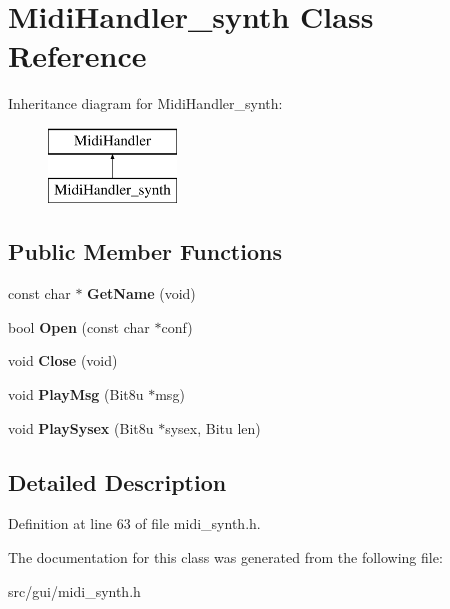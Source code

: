 \hypertarget{classMidiHandler__synth}{\section{Midi\-Handler\-\_\-synth Class Reference}
\label{classMidiHandler__synth}
}
Inheritance diagram for Midi\-Handler\-\_\-synth\-:\begin{figure}[H]
\begin{center}
\leavevmode
\includegraphics[height=2.000000cm]{classMidiHandler__synth}
\end{center}
\end{figure}
\subsection*{Public Member Functions}
\begin{DoxyCompactItemize}
\item 
\hypertarget{classMidiHandler__synth_a454a33652eaf4a99349caf378de56de0}{const char $\ast$ {\bfseries Get\-Name} (void)}\label{classMidiHandler__synth_a454a33652eaf4a99349caf378de56de0}

\item 
\hypertarget{classMidiHandler__synth_a026ce32cbfcb35586e6e6319a375f9ae}{bool {\bfseries Open} (const char $\ast$conf)}\label{classMidiHandler__synth_a026ce32cbfcb35586e6e6319a375f9ae}

\item 
\hypertarget{classMidiHandler__synth_ab73be86b44941f696b08a8eb2a4528e8}{void {\bfseries Close} (void)}\label{classMidiHandler__synth_ab73be86b44941f696b08a8eb2a4528e8}

\item 
\hypertarget{classMidiHandler__synth_afd4de648ae2becfbda22248e30856634}{void {\bfseries Play\-Msg} (Bit8u $\ast$msg)}\label{classMidiHandler__synth_afd4de648ae2becfbda22248e30856634}

\item 
\hypertarget{classMidiHandler__synth_a9f912eb5d21109f9b42c8a4b70d0544f}{void {\bfseries Play\-Sysex} (Bit8u $\ast$sysex, Bitu len)}\label{classMidiHandler__synth_a9f912eb5d21109f9b42c8a4b70d0544f}

\end{DoxyCompactItemize}


\subsection{Detailed Description}


Definition at line 63 of file midi\-\_\-synth.\-h.



The documentation for this class was generated from the following file\-:\begin{DoxyCompactItemize}
\item 
src/gui/midi\-\_\-synth.\-h\end{DoxyCompactItemize}

